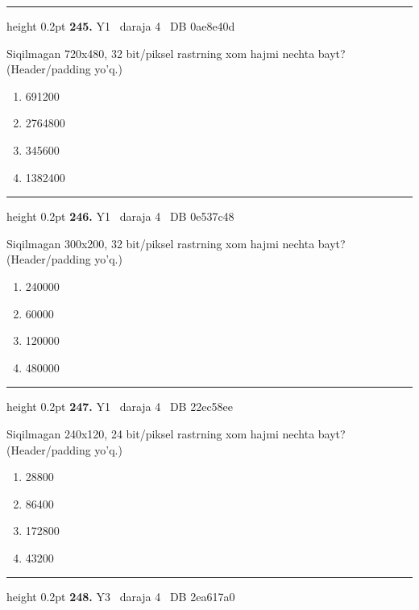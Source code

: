 \documentclass[10pt,a4paper,oneside]{article}
\begin{document}
\vspace{2mm}\hrule height 0.2pt \vspace{4mm}
\hypertarget{q245}{\textbf{\color{ink}245.}}  {\color{muted}\scriptsize Y1 \textbullet\ daraja 4 \textbullet\ DB 0ae8e40d}
\par
Siqilmagan 720x480, 32 bit/piksel rastrning xom hajmi nechta bayt? (Header/padding yo'q.)
\begin{enumerate}[label=\Alph*),leftmargin=9mm]
\item 691200
\item 2764800
\item 345600
\item 1382400
\end{enumerate}
\vspace{2mm}\hrule height 0.2pt \vspace{4mm}
\hypertarget{q246}{\textbf{\color{ink}246.}}  {\color{muted}\scriptsize Y1 \textbullet\ daraja 4 \textbullet\ DB 0e537c48}
\par
Siqilmagan 300x200, 32 bit/piksel rastrning xom hajmi nechta bayt? (Header/padding yo'q.)
\begin{enumerate}[label=\Alph*),leftmargin=9mm]
\item 240000
\item 60000
\item 120000
\item 480000
\end{enumerate}
\vspace{2mm}\hrule height 0.2pt \vspace{4mm}
\hypertarget{q247}{\textbf{\color{ink}247.}}  {\color{muted}\scriptsize Y1 \textbullet\ daraja 4 \textbullet\ DB 22ec58ee}
\par
Siqilmagan 240x120, 24 bit/piksel rastrning xom hajmi nechta bayt? (Header/padding yo'q.)
\begin{enumerate}[label=\Alph*),leftmargin=9mm]
\item 28800
\item 86400
\item 172800
\item 43200
\end{enumerate}
\vspace{2mm}\hrule height 0.2pt \vspace{4mm}
\hypertarget{q248}{\textbf{\color{ink}248.}}  {\color{muted}\scriptsize Y3 \textbullet\ daraja 4 \textbullet\ DB 2ea617a0}
\par
\end{document}
